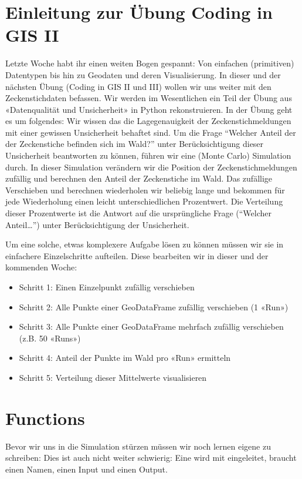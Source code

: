 \documentclass[letterpaper,10pt,english]{sphinxmanual}
\begin{document}
\chapter{Einleitung zur Übung Coding in GIS II}
\label{\detokenize{02_01_Einleitung:einleitung-zur-ubung-coding-in-gis-ii}}\label{\detokenize{02_01_Einleitung::doc}}
Letzte Woche habt ihr einen weiten Bogen gespannt: Von einfachen (primitiven) Datentypen bis hin zu Geodaten und deren Visualisierung. In dieser und der nächsten Übung (Coding in GIS II und III) wollen wir uns weiter mit den Zeckenstichdaten befassen. Wir werden im Wesentlichen ein Teil der Übung aus «Datenqualität und Unsicherheit» in Python rekonstruieren.
In der Übung geht es um folgendes: Wir wissen das die Lagegenauigkeit der Zeckenstichmeldungen mit einer gewissen Unsicherheit behaftet sind. Um die Frage “Welcher Anteil der der Zeckenstiche befinden sich im Wald?” unter Berücksichtigung dieser Unsicherheit beantworten zu können, führen wir eine (Monte Carlo) Simulation durch.
In dieser Simulation verändern wir die Position der Zeckenstichmeldungen zufällig und berechnen den Anteil der Zeckenstiche im Wald. Das zufällige Verschieben und berechnen wiederholen wir beliebig lange und bekommen für jede Wiederholung einen leicht unterschiedlichen Prozentwert. Die Verteilung dieser Prozentwerte ist die Antwort auf die ursprüngliche Frage (“Welcher Anteil…”) unter Berücksichtigung der Unsicherheit.

Um eine solche, etwas komplexere Aufgabe lösen zu können müssen wir sie in einfachere Einzelschritte aufteilen. Diese bearbeiten wir in dieser und der kommenden Woche:
\begin{itemize}
\item {} 
Schritt 1: Einen Einzelpunkt zufällig verschieben

\item {} 
Schritt 2: Alle Punkte einer GeoDataFrame zufällig verschieben (1 «Run»)

\item {} 
Schritt 3: Alle Punkte einer GeoDataFrame mehrfach zufällig verschieben (z.B. 50 «Runs»)

\item {} 
Schritt 4: Anteil der Punkte im Wald pro «Run» ermitteln

\item {} 
Schritt 5: Verteilung dieser Mittelwerte visualisieren

\end{itemize}


\chapter{Functions}
\label{\detokenize{02_02_Functions:functions}}\label{\detokenize{02_02_Functions::doc}}
Bevor wir uns in die Simulation stürzen müssen wir noch lernen eigene  zu schreiben: Dies ist auch nicht weiter schwierig: Eine  wird mit  eingeleitet, braucht einen Namen, einen Input und einen Output.
\end{document}
